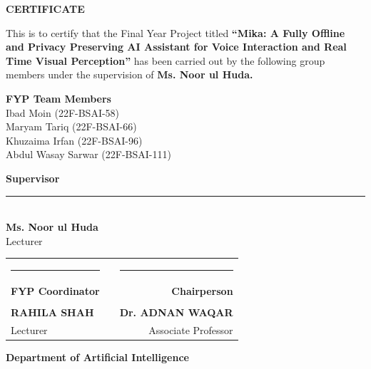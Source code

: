 \documentclass[12pt,a4paper]{report}
\begin{document}

\clearpage
\pagestyle{logoheader}
\thispagestyle{logoheader}
\setcounter{page}{2}

\begin{center}
    \vspace{1cm}
    {\Large \textbf{CERTIFICATE}}
\end{center}

\vspace{0.4cm}

\noindent This is to certify that the Final Year Project titled \textbf{“Mika: A Fully Offline and Privacy Preserving AI Assistant for Voice Interaction and Real Time Visual Perception”} has been carried out by the following group members under the supervision of \textbf{Ms. Noor ul Huda.}


\begin{center}
    {\bfseries FYP Team Members} \\
    \vspace{0.4cm}
    Ibad Moin (22F-BSAI-58) \\
    Maryam Tariq (22F-BSAI-66) \\
    Khuzaima Irfan (22F-BSAI-96) \\
    Abdul Wasay Sarwar (22F-BSAI-111)
\end{center}


\begin{center}
\noindent \textbf{Supervisor} \\
\vspace{0.5cm}
\rule{10cm}{0.4pt} \\
\vspace{0.2cm}
\textbf{Ms. Noor ul Huda}\\
Lecturer

\end{center}

\hspace{1cm}
\begin{tabular}{@{}l c r@{}}
    \rule{5cm}{0.4pt} & & \rule{5cm}{0.4pt} \\
    \textbf{FYP Coordinator} & & \textbf{Chairperson} \\
    & & \\
    \textbf{RAHILA SHAH} & & \textbf{Dr. ADNAN WAQAR} \\
    Lecturer & & Associate Professor
\end{tabular}

\vfill
\begin{center}
    {\bfseries Department of Artificial Intelligence}
\end{center}
\end{document}
